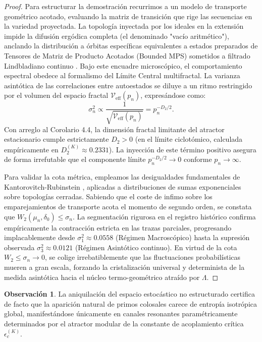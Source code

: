 \documentclass{article}
\numberwithin{equation}{section}
\theoremstyle{plain}
\theoremstyle{definition}
\newtheorem{observacion}[teorema]{Observación}
\begin{document}
\begin{proof}
Para estructurar la demostración recurrimos a un modelo de transporte geométrico acotado, evaluando la matriz de transición que rige las secuencias en la variedad proyectada. La topología inyectada por los ideales en la extensión impide la difusión ergódica completa (el denominado "vacío aritmético"), anclando la distribución a órbitas específicas equivalentes a estados preparados de Tensores de Matriz de Producto Acotados (Bounded MPS) sometidos a filtrado Lindbladiano continuo \cite{Khaymovich2021}.
Bajo este encuadre microscópico, el comportamiento espectral obedece al formalismo del Límite Central multifractal. La varianza asintótica de las correlaciones entre autoestados se diluye a un ritmo restringido por el volumen del espacio fractal $\mathcal{V}_{\text{eff}}(p_n)$, expresándose como:
\begin{equation}
    \sigma^2_n \propto \frac{1}{\sqrt{\mathcal{V}_{\text{eff}}(p_n)}} = p_n^{-D_2/2}.
\end{equation}
Con arreglo al Corolario 4.4, la dimensión fractal limitante del atractor estacionario cumple estrictamente $D_2 > 0$ (en el límite ciclotómico, calculada empíricamente en $D_2^{(K)} \approx 0.2331$). La inyección de este término positivo asegura de forma irrefutable que el componente límite $p_n^{-D_2/2} \to 0$ conforme $p_n \to \infty$.

Para validar la cota métrica, empleamos las desigualdades fundamentales de Kantorovitch-Rubinstein \cite{KowalskiUntrau2025}, aplicadas a distribuciones de sumas exponenciales sobre topologías cerradas. Sabiendo que el coste de infimo sobre los emparejamientos de transporte acota el momento de segundo orden, se constata que $W_2(\mu_n, \delta_0) \le \sigma_n$.
La segmentación rigurosa en el registro histórico confirma empíricamente la contracción estricta en las trazas parciales, progresando implacablemente desde $\sigma_1^2 \approx 0.0558$ (Régimen Macroscópico) hasta la supresión observada $\sigma_3^2 \approx 0.0121$ (Régimen Asintótico continuo). En virtud de la cota $W_2 \le \sigma_n \to 0$, se colige irrebatiblemente que las fluctuaciones probabilísticas mueren a gran escala, forzando la cristalización universal y determinista de la medida asintótica hacia el núcleo termo-geométrico atraído por $\Lambda$.
\end{proof}

\begin{observacion}
La aniquilación del espacio estocástico no estructurado certifica de facto que la aparición natural de primos colosales carece de entropía isotrópica global, manifestándose únicamente en canales resonantes paramétricamente determinados por el atractor modular de la constante de acoplamiento crítica $\epsilon_c^{(K)}$.
\end{observacion}
\end{document}
